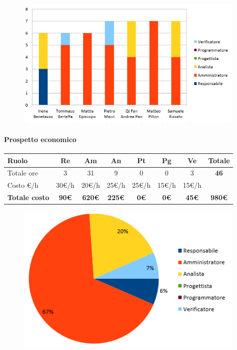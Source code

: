\begin{figure}[H]
    \centering\includegraphics{images/preventivo/RTB-documentale-ore.png}
\end{figure}


\paragraph{Prospetto economico}
\begin{center}
	\renewcommand{\arraystretch}{1.8} %
	\begin{tabular}{ |m{10em}|c|c|c|c|c|c|c| }
	\hline
	\textbf{Ruolo} & \textbf{Re} & \textbf{Am} &  \textbf{An} &  \textbf{Pt} &  \textbf{Pg} &  \textbf{Ve} &  \textbf{Totale}\\
    \hline
    Totale ore & 3 & 31 & 9 & 0 & 0 & 3 & \textbf{46}\\
    \hline
    Costo \euro/h & 30\euro/h & 20\euro/h & 25\euro/h & 25\euro/h & 15\euro/h & 15\euro/h & \\
    \hline
    \textbf{Totale costo} & \textbf{90\euro} & \textbf{620\euro} &  \textbf{225\euro} &  \textbf{0\euro} &  \textbf{0\euro} &  \textbf{45\euro} &  \textbf{980\euro}\\
    \hline
	\end{tabular}

    \begin{figure}[H]
        \centering\includegraphics{images/preventivo/RTB-documentale-costo.png}
    \end{figure}
\end{center}


